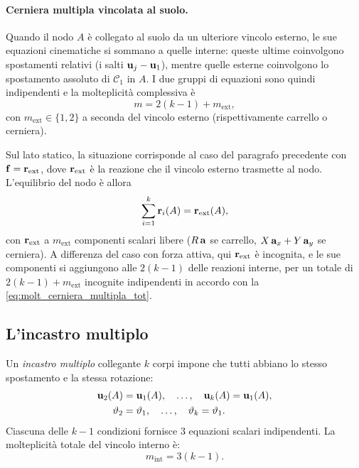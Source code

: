 \paragraph{Cerniera multipla vincolata al suolo.}
Quando il nodo $A$ è collegato al suolo da un ulteriore
vincolo esterno, le sue equazioni cinematiche si sommano
a quelle interne: queste ultime coinvolgono spostamenti
relativi (i salti $\mathbf{u}_j - \mathbf{u}_1$), mentre quelle esterne
coinvolgono lo spostamento assoluto di $\mathcal{C}_1$ in
$A$. I due gruppi di equazioni sono quindi indipendenti
e la molteplicità complessiva è
\begin{equation}\label{eq:molt_cerniera_multipla_tot}
	m = 2(k-1) + m_\text{ext},
\end{equation}
con $m_\text{ext} \in \{1, 2\}$ a seconda del vincolo
esterno (rispettivamente carrello o cerniera).

Sul lato statico, la situazione corrisponde al caso del
paragrafo precedente con $\mathbf{f} = \mathbf{r}_\text{ext}$, dove
$\mathbf{r}_\text{ext}$ è la reazione che il vincolo esterno
trasmette al nodo. L'equilibrio del nodo è allora
\begin{equation}
	\sum_{i=1}^{k} \mathbf{r}_i(A) = \mathbf{r}_\text{ext}(A),
\end{equation}
con $\mathbf{r}_\text{ext}$ a $m_\text{ext}$ componenti scalari
libere ($R\,\mathbf{a}$ se carrello, $X\,\mathbf{a}_x + Y\,\mathbf{a}_y$ se
cerniera). A differenza del caso con forza attiva, qui
$\mathbf{r}_\text{ext}$ è incognita, e le sue componenti si
aggiungono alle $2(k-1)$ delle reazioni interne, per un
totale di $2(k-1) + m_\text{ext}$ incognite indipendenti
in accordo con la \eqref{eq:molt_cerniera_multipla_tot}.

\subsection{L'incastro multiplo}
\label{sec:incastro_multiplo}

Un \emph{incastro multiplo} collegante $k$ corpi impone
che tutti abbiano lo stesso spostamento e la stessa
rotazione:
\begin{align}
	\mathbf{u}_2(A) &= \mathbf{u}_1(A), \quad
	\ldots, \quad
	\mathbf{u}_k(A) = \mathbf{u}_1(A),\\
	\vartheta_2 &= \vartheta_1, \quad
	\ldots, \quad
	\vartheta_k = \vartheta_1.
\end{align}
Ciascuna delle $k-1$ condizioni fornisce 3 equazioni
scalari indipendenti. La molteplicità totale del vincolo
interno è:
\begin{equation}\label{eq:molt_incastro_multiplo}
	m_\text{int} = 3(k-1).
\end{equation}

